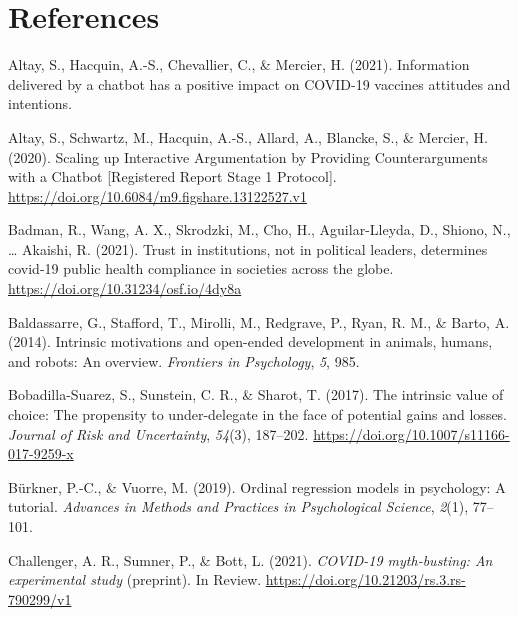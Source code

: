 \documentclass[
  english,
  ,jou,floatsintext]{apa6}
\newlength{\cslhangindent}
\newlength{\cslentryspacingunit} %
\newenvironment{CSLReferences}[2] %
 {%
  \setlength{\parindent}{0pt}
  \ifodd #1
  \let\oldpar\par
  \def\par{\hangindent=\cslhangindent\oldpar}
  \fi
  \setlength{\parskip}{#2\cslentryspacingunit}
 }%
 {}
\begin{document}
\hypertarget{references}{%
\section*{References}\label{references}}

\hypertarget{refs}{}
\begin{CSLReferences}{1}{0}
\leavevmode{}%
Altay, S., Hacquin, A.-S., Chevallier, C., \& Mercier, H. (2021). Information delivered by a chatbot has a positive impact on COVID-19 vaccines attitudes and intentions.

\leavevmode{}%
Altay, S., Schwartz, M., Hacquin, A.-S., Allard, A., Blancke, S., \& Mercier, H. (2020). Scaling up {Interactive} {Argumentation} by {Providing} {Counterarguments} with a {Chatbot} {[}{Registered} {Report} {Stage} 1 {Protocol}{]}. \url{https://doi.org/10.6084/m9.figshare.13122527.v1}

\leavevmode{}%
Badman, R., Wang, A. X., Skrodzki, M., Cho, H., Aguilar-Lleyda, D., Shiono, N., \ldots{} Akaishi, R. (2021). Trust in institutions, not in political leaders, determines covid-19 public health compliance in societies across the globe. \url{https://doi.org/10.31234/osf.io/4dy8a}

\leavevmode{}%
Baldassarre, G., Stafford, T., Mirolli, M., Redgrave, P., Ryan, R. M., \& Barto, A. (2014). Intrinsic motivations and open-ended development in animals, humans, and robots: An overview. \emph{Frontiers in Psychology}, \emph{5}, 985.

\leavevmode{}%
Bobadilla-Suarez, S., Sunstein, C. R., \& Sharot, T. (2017). The intrinsic value of choice: {The} propensity to under-delegate in the face of potential gains and losses. \emph{Journal of Risk and Uncertainty}, \emph{54}(3), 187--202. \url{https://doi.org/10.1007/s11166-017-9259-x}

\leavevmode{}%
Bürkner, P.-C., \& Vuorre, M. (2019). Ordinal regression models in psychology: A tutorial. \emph{Advances in Methods and Practices in Psychological Science}, \emph{2}(1), 77--101.

\leavevmode{}%
Challenger, A. R., Sumner, P., \& Bott, L. (2021). \emph{{COVID}-19 myth-busting: An experimental study} (preprint). In Review. \url{https://doi.org/10.21203/rs.3.rs-790299/v1}


\end{CSLReferences}
\end{document}
